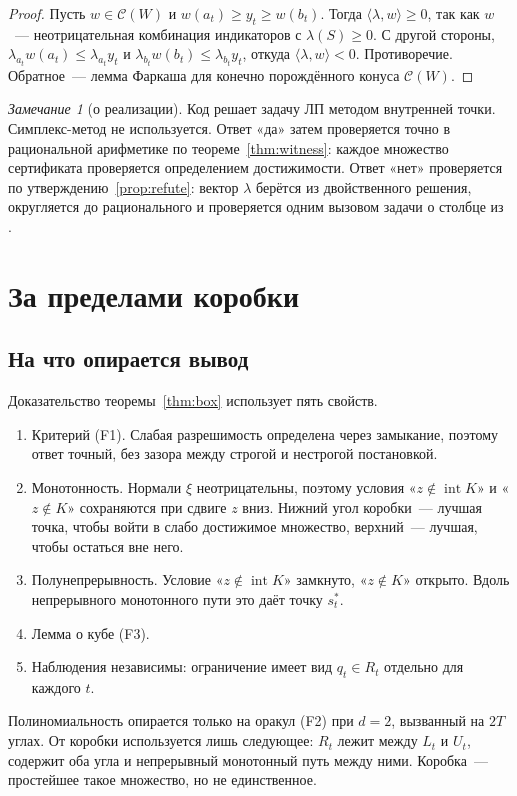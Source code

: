 \documentclass[a4paper,11pt]{article}
\theoremstyle{plain}
\theoremstyle{definition}
\theoremstyle{remark}
\newtheorem*{remark}{Замечание}
\newcommand{\ip}[2]{\langle #1, #2\rangle}
\DeclareMathOperator{\interior}{int}
\newcommand{\Cw}{\mathcal C}
\begin{document}
\begin{proof}
    Пусть $w\in\Cw(W)$ и $w(a_t)\ge y_t\ge w(b_t)$. Тогда $\ip{\lambda}{w}\ge0$, так как $w$~--- неотрицательная комбинация индикаторов с $\lambda(S)\ge0$. С другой стороны, $\lambda_{a_t}w(a_t)\le\lambda_{a_t}y_t$ и $\lambda_{b_t}w(b_t)\le\lambda_{b_t}y_t$, откуда $\ip{\lambda}{w}<0$. Противоречие. Обратное~--- лемма Фаркаша для конечно порождённого конуса $\Cw(W)$.
\end{proof}

\begin{remark}[о реализации]
    Код решает задачу ЛП методом внутренней точки. Симплекс-метод не используется. Ответ «да» затем проверяется точно в рациональной арифметике по теореме~\ref{thm:witness}: каждое множество сертификата проверяется определением достижимости. Ответ «нет» проверяется по утверждению~\ref{prop:refute}: вектор $\lambda$ берётся из двойственного решения, округляется до рационального и проверяется одним вызовом задачи о столбце из .
\end{remark}

\section{За пределами коробки}\label{sec:beyond}

\subsection{На что опирается вывод}

Доказательство теоремы~\ref{thm:box} использует пять свойств.
\begin{enumerate}[label=(\roman*)]
    \item Критерий (F1). Слабая разрешимость определена через замыкание, поэтому ответ точный, без зазора между строгой и нестрогой постановкой.
    \item Монотонность. Нормали $\xi$ неотрицательны, поэтому условия «$z\notin\interior K$» и «$z\notin K$» сохраняются при сдвиге $z$ вниз. Нижний угол коробки~--- лучшая точка, чтобы войти в слабо достижимое множество, верхний~--- лучшая, чтобы остаться вне него.
    \item Полунепрерывность. Условие «$z\notin\interior K$» замкнуто, «$z\notin K$» открыто. Вдоль непрерывного монотонного пути это даёт точку $s^*_t$.
    \item Лемма о кубе (F3).
    \item Наблюдения независимы: ограничение имеет вид $q_t\in R_t$ отдельно для каждого $t$.
\end{enumerate}
Полиномиальность опирается только на оракул (F2) при $d=2$, вызванный на $2T$ углах. От коробки используется лишь следующее: $R_t$ лежит между $L_t$ и $U_t$, содержит оба угла и непрерывный монотонный путь между ними. Коробка~--- простейшее такое множество, но не единственное.
\end{document}
